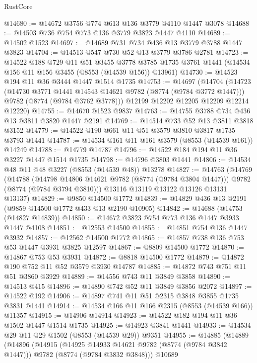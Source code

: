 \begin{lexlean}{RustCore}
\begin{coremodule}
@14680 := @14672 @3756 @774 @613 @136 @3779 @4110 @1447 @3078
@14688 := @14503 @736 @754 @773 @136 @3779 @3823 @1447 @4110
@14689 := @14502 @1523
@14697 := @14689 @731 @734 @436 @13 @3779 @3788 @1447 @3823
@14704 := @14513 @547 @730 @52 @13 @3779 @3786 @2781
@14723 := @14522
    @188
    @729
    @11
    @51
    @3455
    @3778
    @3785
    @1735
    @3761
    @1441
    (@14534 @156 @11 @156 @3455 (@8553 (@14539 @156)) @13961)
@14730 := @14523 @194 @11 @36 @3444 @1447 @1514 @1735
@14753 := @14697
    (@14704
      (@14723
        (@14730 @3771 @1441 @14543 @14621 @9782 (@8774 (@9784 @3772 @1447)))
        @9782
        (@8774 (@9784 @3762 @3778)))
      @12199
      @12202
      @12205
      @12209
      @12214
      @12220)
@14755 := @14670 @1523 @9837
@14763 := @14755 @3788 @734 @436 @13 @3811 @3820 @1447 @2191
@14769 := @14514 @733 @52 @13 @3811 @3818 @3152
@14779 := @14522 @190 @661 @11 @51 @3579 @3810 @3817 @1735 @3793 @1441
@14787 := @14534 @161 @11 @161 @3579 (@8553 (@14539 @161)) @14249
@14788 := @14779 @14787
@14796 := @14522 @184 @194 @11 @36 @3227 @1447 @1514 @1735
@14798 := @14796 @3803 @1441
@14806 := @14534 @48 @11 @48 @3227 (@8553 (@14539 @48)) @13278
@14827 := @14763
    (@14769
      (@14788
        (@14798 @14806 @14621 @9782 (@8774 (@9784 @3804 @1447)))
        @9782
        (@8774 (@9784 @3794 @3810)))
      @13116
      @13119
      @13122
      @13126
      @13131
      @13137)
@14829 := @9850 @14500 @1772
@14839 := @14829 @436 @13 @2191 (@9859 @14500 @1772 @433 @13 @2190 @10905)
@14842 := @14688 (@14753 (@14827 @14839))
@14850 := @14672 @3823 @754 @773 @136 @1447 @3933 @1447 @4108
@14851 := @12553 @14500
@14855 := @14851 @754 @136 @1447 @3932
@14857 := @12562 @14500 @1772
@14865 := @14857 @738 @136 @753 @53 @1447 @3931 @3825 @12597
@14867 := @8809 @14500 @1772
@14870 := @14867 @753 @53 @3931
@14872 := @8818 @14500 @1772
@14879 := @14872 @190 @752 @11 @52 @3579 @3930 @14787
@14885 := @14872 @743 @751 @11 @51 @3860 @3929
@14889 := @14556 @743 @11 @3849 @3858
@14890 := @14513 @415
@14896 := @14890 @742 @52 @11 @3849 @3856 @2072
@14897 := @14522 @192
@14906 := @14897 @741 @11 @51 @2315 @3848 @3855 @1735 @3831 @1441
@14914 := @14534 @166 @11 @166 @2315 (@8553 (@14539 @166)) @11357
@14915 := @14906 @14914
@14923 := @14522 @182 @194 @11 @36 @1502 @1447 @1514 @1735
@14925 := @14923 @3841 @1441
@14933 := @14534 @29 @11 @29 @1502 (@8553 (@14539 @29)) @9351
@14955 := @14885
    (@14889
      (@14896
        (@14915
          (@14925 @14933 @14621 @9782 (@8774 (@9784 @3842 @1447)))
          @9782
          (@8774 (@9784 @3832 @3848)))
        @10689

\end{coremodule}
\end{lexlean}
